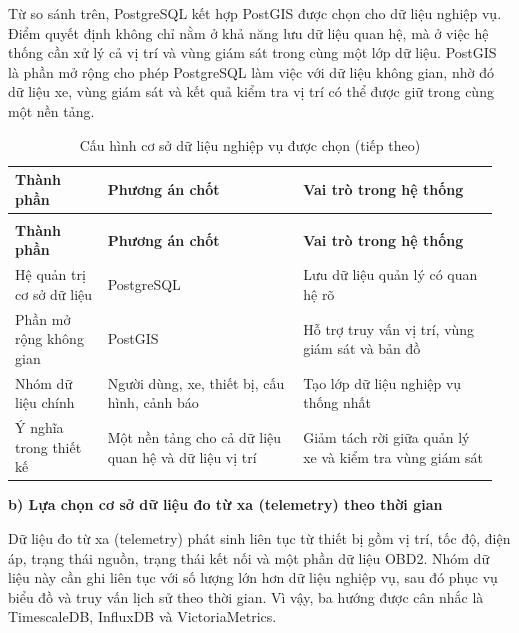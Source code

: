 \documentclass[a4paper]{extarticle}
\newcommand{\thesissettableid}[2]{%
  \renewcommand{\thetable}{#1}%
  \renewcommand{\theHtable}{#2}%
}
\begin{document}
Từ so sánh trên, PostgreSQL kết hợp PostGIS được chọn cho dữ liệu nghiệp vụ.
Điểm quyết định không chỉ nằm ở khả năng lưu dữ liệu quan hệ, mà ở việc hệ
thống cần xử lý cả vị trí và vùng giám sát trong cùng một lớp dữ liệu. PostGIS
là phần mở rộng cho phép PostgreSQL làm việc với dữ liệu không gian, nhờ đó dữ
liệu xe, vùng giám sát và kết quả kiểm tra vị trí có thể được giữ trong cùng
một nền tảng.

{\thesissettableid{3.26}{condensed-bang-3-26-cau-hinh-co-so-du-lieu-nghiep-vu-duoc-chon}
\def\LTcaptype{table}
\begin{longtable}{|L{0.188\linewidth}|L{0.382\linewidth}|L{0.388\linewidth}|}
\caption{Cấu hình cơ sở dữ liệu nghiệp vụ được chọn}\label{tab:condensed-bang-3-26-cau-hinh-co-so-du-lieu-nghiep-vu-duoc-chon}\\
\hline
\textbf{Thành phần} & \textbf{Phương án chốt} & \textbf{Vai trò trong hệ thống} \\
\hline
\endfirsthead
\caption[]{Cấu hình cơ sở dữ liệu nghiệp vụ được chọn (tiếp theo)}\\
\hline
\textbf{Thành phần} & \textbf{Phương án chốt} & \textbf{Vai trò trong hệ thống} \\
\hline
\endhead
\endfoot
\endlastfoot
Hệ quản trị cơ sở dữ liệu & PostgreSQL & Lưu dữ liệu quản lý có quan hệ rõ \\\hline
Phần mở rộng không gian & PostGIS & Hỗ trợ truy vấn vị trí, vùng giám sát và bản đồ \\\hline
Nhóm dữ liệu chính & Người dùng, xe, thiết bị, cấu hình, cảnh báo & Tạo lớp dữ liệu nghiệp vụ thống nhất \\\hline
Ý nghĩa trong thiết kế & Một nền tảng cho cả dữ liệu quan hệ và dữ liệu vị trí & Giảm tách rời giữa quản lý xe và kiểm tra vùng giám sát \\\hline
\end{longtable}
}

\textbf{b) Lựa chọn cơ sở dữ liệu đo từ xa (telemetry) theo thời gian}

Dữ liệu đo từ xa (telemetry) phát sinh liên tục từ thiết bị gồm vị trí, tốc độ, điện áp, trạng
thái nguồn, trạng thái kết nối và một phần dữ liệu OBD2. Nhóm dữ liệu này cần
ghi liên tục với số lượng lớn hơn dữ liệu nghiệp vụ, sau đó phục vụ biểu đồ và
truy vấn lịch sử theo thời gian. Vì vậy, ba hướng được cân nhắc là TimescaleDB,
InfluxDB và VictoriaMetrics.
\end{document}
